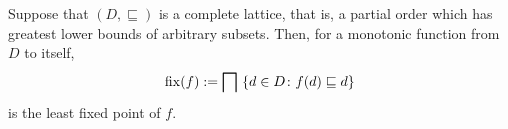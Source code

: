\begin{thm}\label{thm:knaster-tarski} %
  Suppose that \((D, {}\sqsubseteq)\) is a complete lattice, that is, a partial order which has greatest lower bounds of arbitrary subsets.
  Then, for a monotonic function from \(D\) to itself,
  \begin{equation}
    \fix(f) := \bigsqcap\,\,\lbrace d \in D \colon f(d) \sqsubseteq d \rbrace %
  \end{equation}
  is the least fixed point of \(f\).
\end{thm}
